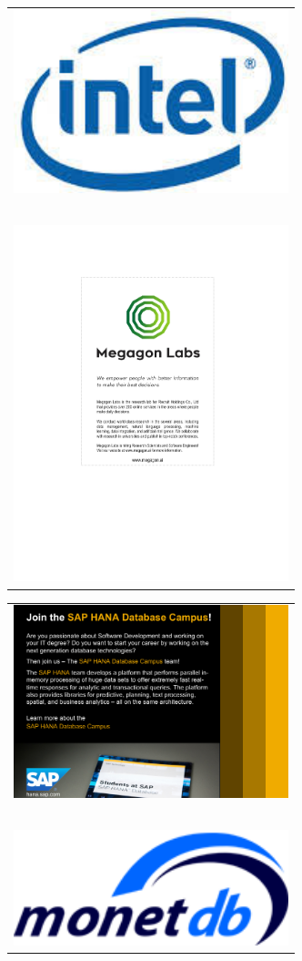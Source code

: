 \begin{tabular}{C{\linewidth}}
\includegraphics[width=80mm]{ads/intel.jpg} \\ ~ \\
\includegraphics[width=80mm]{ads/megagon.pdf}
\end{tabular}



\begin{tabular}{C{\linewidth}}
\includegraphics[width=80mm]{ads/sap.pdf} \\ ~ \\
\includegraphics[width=80mm]{ads/monetdb.png}
\end{tabular}



